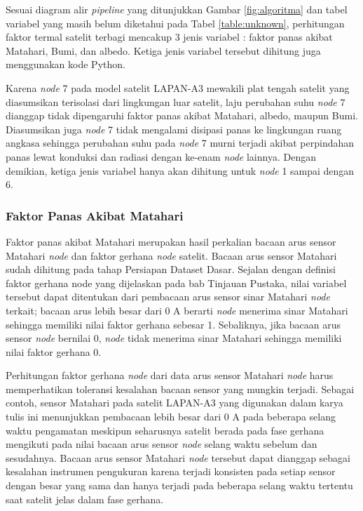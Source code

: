 Sesuai diagram alir \textit{pipeline} yang ditunjukkan Gambar
\ref{fig:algoritma} dan tabel variabel yang masih belum diketahui pada Tabel
\ref{table:unknown}, perhitungan faktor termal satelit terbagi mencakup 3 jenis
variabel : faktor panas akibat Matahari, Bumi, dan albedo. Ketiga jenis
variabel tersebut dihitung juga menggunakan kode Python.

Karena \textit{node} 7 pada model satelit LAPAN-A3 mewakili plat tengah satelit
yang diasumsikan terisolasi dari lingkungan luar satelit, laju perubahan suhu
\textit{node} 7 dianggap tidak dipengaruhi faktor panas akibat Matahari,
albedo, maupun Bumi. Diasumsikan juga \textit{node} 7 tidak mengalami disipasi
panas ke lingkungan ruang angkasa sehingga perubahan suhu pada \textit{node} 7
murni terjadi akibat perpindahan panas lewat konduksi dan radiasi dengan
ke-enam \textit{node} lainnya. Dengan demikian, ketiga jenis variabel hanya
akan dihitung untuk \textit{node} 1 sampai dengan 6.


\subsubsection{Faktor Panas Akibat Matahari}

Faktor panas akibat Matahari merupakan hasil perkalian bacaan arus sensor
Matahari \textit{node} dan faktor gerhana \textit{node} satelit. Bacaan arus
sensor Matahari sudah dihitung pada tahap Persiapan Dataset Dasar. Sejalan
dengan definisi faktor gerhana node yang dijelaskan pada bab Tinjauan Pustaka,
nilai variabel tersebut dapat ditentukan dari pembacaan arus sensor sinar
Matahari \textit{node} terkait; bacaan arus lebih besar dari 0 A berarti
\textit{node} menerima sinar Matahari sehingga memiliki nilai faktor gerhana
sebesar 1. Sebaliknya, jika bacaan arus sensor \textit{node} bernilai 0,
\textit{node} tidak menerima sinar Matahari sehingga memiliki nilai faktor
gerhana 0.

Perhitungan faktor gerhana \textit{node} dari data arus sensor Matahari
\textit{node} harus memperhatikan toleransi kesalahan bacaan sensor yang
mungkin terjadi. Sebagai contoh, sensor Matahari pada satelit LAPAN-A3 yang
digunakan dalam karya tulis ini menunjukkan pembacaan lebih besar dari 0 A pada
beberapa selang waktu pengamatan meskipun seharusnya satelit berada pada fase
gerhana mengikuti pada nilai bacaan arus sensor \textit{node} selang waktu
sebelum dan sesudahnya. Bacaan arus sensor Matahari \textit{node} tersebut
dapat dianggap sebagai kesalahan instrumen pengukuran karena terjadi konsisten
pada setiap sensor dengan besar yang sama dan hanya terjadi pada beberapa
selang waktu tertentu saat satelit jelas dalam fase gerhana.


